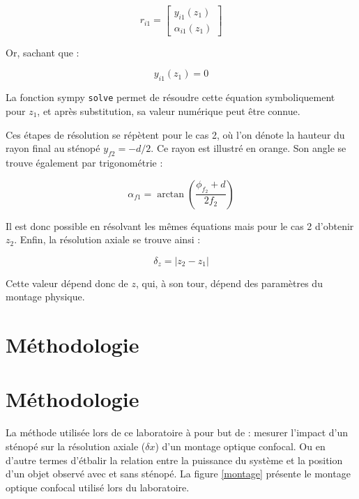 \documentclass[11pt,letterpaper]{article}
\begin{document}
\begin{equation}
  r_{i1}= \begin{bmatrix}
   y_{i1}(z_{1})  \\
    \alpha_{i1}(z_{1})
  \end{bmatrix}
\end{equation}

Or, sachant que :

\begin{equation}
  y_{i1}(z_{1})=0
\end{equation}

La fonction sympy \texttt{solve} permet de résoudre cette équation symboliquement pour $z_{1}$, et après substitution, sa valeur numérique peut être connue.

Ces étapes de résolution se répètent pour le cas 2, où l'on dénote la hauteur du rayon final au sténopé $y_{f2} = -d/2$. Ce rayon est illustré en orange. Son angle se trouve également par trigonométrie :

\begin{equation}
  \alpha_{f1}= \arctan\left( \frac{\phi_{f_{2}}+d}{2f_{2}} \right)
\end{equation}

Il est donc possible en résolvant les mêmes équations mais pour le cas 2 d'obtenir $z_{2}$. Enfin, la résolution axiale se trouve ainsi :

\begin{equation}
  \delta_{z}= |z_{2}-z_{1}|
\end{equation}

Cette valeur dépend donc de $z$, qui, à son tour, dépend des paramètres du montage physique.

\section{Méthodologie}

\section{Méthodologie}

La méthode utilisée lors de ce laboratoire à pour but de : mesurer l'impact d'un sténopé sur la résolution axiale ($\delta x$) d'un montage optique confocal. Ou en d'autre termes d'étbalir la relation entre la puissance du système et la position d'un objet observé avec et sans sténopé. La figure \ref{montage} présente le montage optique confocal utilisé lors du laboratoire. 
\end{document}
